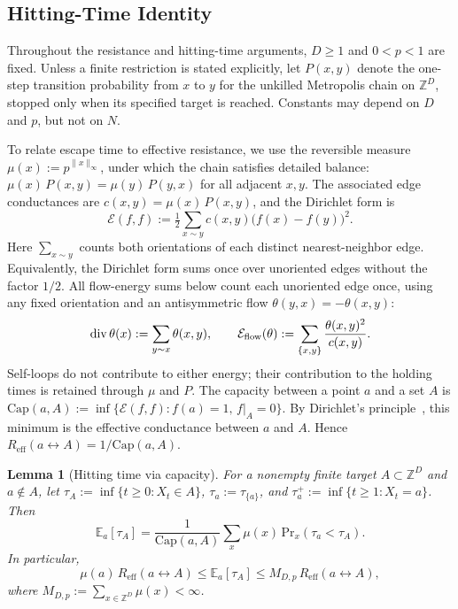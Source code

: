 \documentclass[conference]{IEEEtran}
\newtheorem{lemma}{Lemma}
\newcommand{\E}{\mathbb{E}}
\newcommand{\Z}{\mathbb{Z}}
\newcommand{\norm}[1]{\lVert #1\rVert}
\newcommand{\Energy}{\mathcal{E}}
\begin{document}

\subsection{Hitting-Time Identity}
\label{sec:hitting-time}
Throughout the resistance and hitting-time arguments, $D\ge1$ and
$0<p<1$ are fixed. Unless a finite restriction is stated explicitly,
let $P(x,y)$ denote the one-step transition probability
from $x$ to $y$ for the unkilled Metropolis chain on $\Z^D$, stopped only when
its specified target is reached. Constants may depend on $D$ and $p$,
but not on $N$.

To relate escape time to effective resistance, we use
the reversible measure $\mu(x) := p^{\norm{x}_\infty}$, under which
the chain satisfies detailed balance:
$\mu(x)\,P(x,y) = \mu(y)\,P(y,x)$ for all adjacent $x,y$.
The associated edge conductances are $c(x,y) = \mu(x)\,P(x,y)$,
and the Dirichlet form is
\[
\Energy(f,f) := \tfrac{1}{2}\sum_{x \sim y} c(x,y)\bigl(f(x)-f(y)\bigr)^2.
\]
Here $\sum_{x\sim y}$ counts both orientations of each distinct
nearest-neighbor edge. Equivalently, the Dirichlet form sums once over
unoriented edges without the factor $1/2$. All flow-energy sums below
count each unoriented edge once, using any fixed orientation and an
antisymmetric flow $\theta(y,x)=-\theta(x,y)$:
\[
\operatorname{div}\theta(x):=\sum_{y\sim x}\theta(x,y),
\qquad \mathcal E_{\rm flow}(\theta):=
\sum_{\{x,y\}}\frac{\theta(x,y)^2}{c(x,y)}.
\]
Self-loops do not contribute to either energy; their contribution to
the holding times is retained through $\mu$ and $P$.
The capacity between a point $a$ and a set $A$ is
$\mathrm{Cap}(a,A) := \inf\{\Energy(f,f) : f(a)=1,\, f|_A=0\}$.
By Dirichlet's principle~\cite{doyle1984}, this minimum is
the effective conductance between $a$ and $A$. Hence
$R_{\mathrm{eff}}(a\leftrightarrow A)=1/\mathrm{Cap}(a,A)$.

\begin{lemma}[Hitting time via capacity]
\label{lem:hitting}
 For a nonempty finite target $A\subset\Z^D$ and $a\notin A$, let
$\tau_A:=\inf\{t\ge0:X_t\in A\}$, $\tau_a:=\tau_{\{a\}}$, and
$\tau_a^+:=\inf\{t\ge1:X_t=a\}$. Then
\begin{equation}
\label{eq:hitting-identity}
\E_a[\tau_A] = \frac{1}{\mathrm{Cap}(a,A)}
\sum_{x} \mu(x)\,\mathrm{Pr}_x(\tau_a < \tau_A).
\end{equation}
In particular,
\begin{equation}
\label{eq:hitting-bounds}
\mu(a)\,R_{\mathrm{eff}}(a \leftrightarrow A)
\le \E_a[\tau_A]
\le M_{D,p}\,R_{\mathrm{eff}}(a \leftrightarrow A),
\end{equation}
where $M_{D,p} := \sum_{x \in \Z^D} \mu(x) < \infty$.
\end{lemma}
\end{document}
